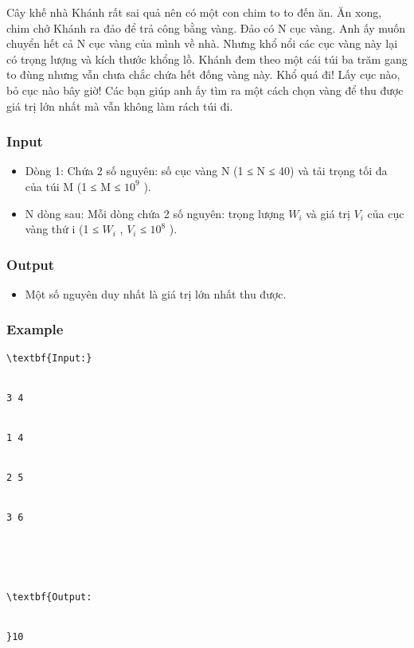 



   Cây khế nhà Khánh rất sai quả nên có một con chim to to đến ăn. Ăn xong, chim chở Khánh ra đảo để trả công bằng vàng. Đảo có N cục vàng. Anh ấy muốn chuyển hết cả N cục vàng của mình về nhà. Nhưng khổ nổi các cục vàng này lại có trọng lượng và kích thước khổng lồ. Khánh đem theo một cái túi ba trăm gang to đùng nhưng vẫn chưa chắc chứa hết đống vàng này. Khổ quá đi! Lấy cục nào, bỏ cục nào bây giờ! Các bạn giúp anh ấy tìm ra một cách chọn vàng để thu được giá trị lớn nhất mà vẫn không làm rách túi đi.  

\subsubsection{   Input  }
\begin{itemize}
	\item     Dòng 1: Chứa 2 số nguyên: số cục vàng N (1 ≤ N ≤ 40) và tải trọng tối đa của túi M (1 ≤ M ≤ $10^{9}$    ).   
	\item     N dòng sau: Mỗi dòng chứa 2 số nguyên: trọng lượng $W_{i}$    và giá trị $V_{i}$    của cục vàng thứ i (1 ≤ $W_{i}$    , $V_{i}$    ≤ $10^{8}$    ).   
\end{itemize}

\subsubsection{   Output  }
\begin{itemize}
	\item     Một số nguyên duy nhất là giá trị lớn nhất thu được.   
\end{itemize}

\subsubsection{   Example  }
\begin{verbatim}
\textbf{Input:}


3 4


1 4


2 5


3 6





\textbf{Output:


}10


\end{verbatim}
